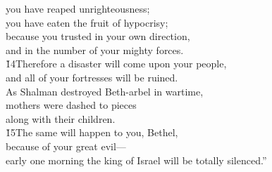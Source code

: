 \begin{poetry}
\poemll    you have reaped unrighteousness; \\
\poemlll       you have eaten the fruit of hypocrisy; \\
\poeml because you trusted in your own direction, \\
\poemll    and in the number of your mighty forces. \\
\poeml \v{14}Therefore a disaster will come upon your people, \\
\poemll    and all of your fortresses will be ruined. \\
\poeml As Shalman destroyed Beth-arbel in wartime, \\
\poemll    mothers were dashed to pieces \\
\poemlll       along with their children. \\
\poeml \v{15}The same will happen to you, Bethel, \\
\poemll    because of your great evil--- \\
\poemlll       early one morning the king of Israel will be totally silenced.''
\end{poetry}


